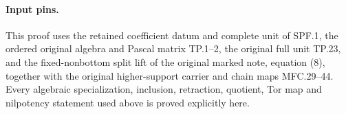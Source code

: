 \paragraph{Input pins.}
This proof uses the retained coefficient datum and complete unit
of SPF.1, the ordered original algebra and Pascal matrix TP.1--2,
the original full unit TP.23, and the fixed-nonbottom split lift
of the original marked note, equation (8), together with the
original higher-support carrier and chain maps MFC.29--44.
Every algebraic
specialization, inclusion, retraction, quotient, Tor map and
nilpotency statement used above is proved explicitly here.
